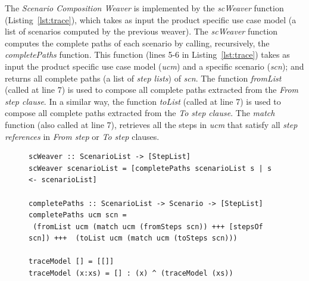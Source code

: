 \documentclass{acm_proc_article-sp}
\begin{document}

\newpage
The \emph{Scenario Composition Weaver} is implemented by the \emph{scWeaver} function (Listing~\ref{lst:trace}), which takes 
as input the product specific use case model (a list of scenarios computed by the previous weaver).  
The \emph{scWeaver} function computes the complete paths of each  
scenario by calling, recursively, the \emph{completePaths} function. This 
function (lines 5-6 in Listing~\ref{lst:trace}) 
takes as input the product specific use case model (\emph{ucm}) and a specific
scenario (\emph{scn});
and returns all complete paths (a list of \emph{step lists}) of
\emph{scn}. The function \emph{fromList} (called at line 7) is used to
compose all complete paths extracted from the \emph{From step
clause}. In a similar way, the function \emph{toList} (called at
line 7) is used to compose all complete paths extracted from the
\emph{To step clause}. The \emph{match} function (also called at
line 7), retrieves all the steps in \emph{ucm} that satisfy all 
\emph{step references} in \emph{From step} or \emph{To step}
clauses. 


\begin{figure}
\begin{lstlisting}[belowskip=10pt,frame=tb,caption={Scenario composition weaver function},label=lst:trace]
scWeaver :: ScenarioList -> [StepList]
scWeaver scenarioList = [completePaths scenarioList s | s <- scenarioList]
 
completePaths :: ScenarioList -> Scenario -> [StepList]
completePaths ucm scn =
 (fromList ucm (match ucm (fromSteps scn)) +++ [stepsOf scn]) +++  (toList ucm (match ucm (toSteps scn)))

traceModel [] = [[]]
traceModel (x:xs) = [] : (x) ^ (traceModel (xs))
\end{lstlisting}
\end{figure}
\end{document}
